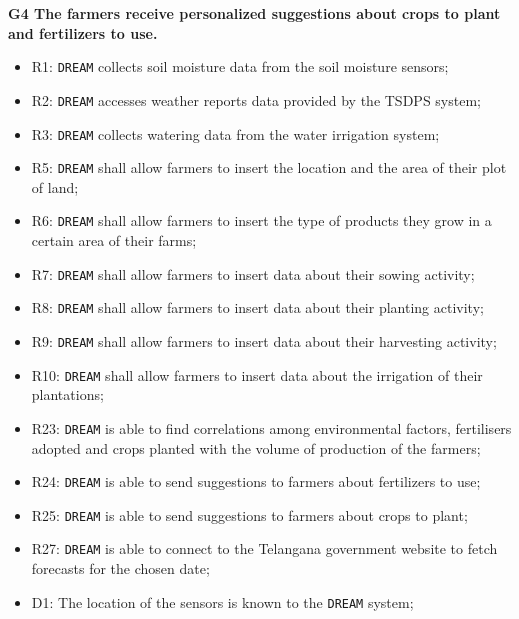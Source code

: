 \documentclass{article}
\begin{document}
\vspace{5mm}
\textbf{G4 The farmers receive personalized suggestions about crops to plant and fertilizers to use.}
\begin{itemize}
    \item R1: \verb|DREAM| collects soil moisture data from the soil moisture sensors;
    \item R2: \verb|DREAM| accesses weather reports data provided by the TSDPS system;

    \item R3: \verb|DREAM| collects watering data from the water irrigation system;

    \item R5: \verb|DREAM| shall allow farmers to insert the location and the area of their plot of land;

    \item R6: \verb|DREAM| shall allow farmers to insert the type of products they grow in a certain area of their farms;

    \item R7: \verb|DREAM| shall allow farmers to insert data about their sowing activity;

    \item R8: \verb|DREAM| shall allow farmers to insert data about their planting activity;
    
    \item R9: \verb|DREAM| shall allow farmers to insert data about their harvesting activity;
    
    \item R10: \verb|DREAM| shall allow farmers to insert data about the irrigation of their plantations;
    
    \item R23: \verb|DREAM| is able to find correlations among environmental factors, fertilisers adopted and crops planted with the volume of production of the farmers;
 
    \item R24: \verb|DREAM| is able to send suggestions to farmers about fertilizers to use;
    
    \item R25: \verb|DREAM| is able to send suggestions to farmers about crops to plant; 
 
    \item R27: \verb|DREAM| is able to connect to the Telangana government website to fetch forecasts for the chosen date;
    
    \item D1: The location of the sensors is known to the \verb|DREAM| system;
    

\end{itemize}
\end{document}
